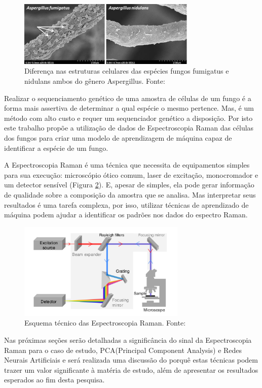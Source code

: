\documentclass[conference,peerreview]{IEEEtran}
\begin{document}
\begin{figure}[ht]
\centering
\includegraphics[width=8.5cm]{fungus_dif}
\caption{Diferença nas estruturas celulares das espécies fungos fumigatus e nidulans ambos do gênero Aspergillus. Fonte: \cite{Lee2015}}
\label{fungus_dif}
\end{figure}

Realizar o sequenciamento genético de uma amostra de células de um fungo é a forma mais assertiva de determinar a qual espécie o mesmo pertence. Mas, é um método com alto custo e requer um sequenciador genético a disposição. Por isto este trabalho propõe a utilização de dados de Espectroscopia Raman das células dos fungos para criar uma modelo de aprendizagem de máquina capaz de identificar a espécie de um fungo.

A Espectroscopia Raman é uma técnica que necessita de equipamentos simples para sua execução: microscópio ótico comum, laser de excitação, monocromador e um detector sensível (Figura \ref{esquema_experimento}). E, apesar de simples, ela pode gerar informação de qualidade sobre a composição da amostra que se analisa. Mas interpretar seus resultados é uma tarefa complexa, por isso, utilizar técnicas de aprendizado de máquina podem ajudar a identificar os padrões nos dados do espectro Raman.

\begin{figure}[ht]
\centering
\includegraphics[width=8cm]{esquema_experimento}
\caption{Esquema técnico das Espectroscopia Raman. Fonte: \cite{Butler2016}}
\label{esquema_experimento}
\end{figure}

Nas próximas seções serão detalhadas a significância do sinal da Espectroscopia Raman para o caso de estudo, PCA(Principal Component Analysis) e Redes Neurais Artificiais e será realizada uma discussão do porquê estas técnicas podem trazer um valor significante à matéria de estudo, além de apresentar os resultados esperados ao fim desta pesquisa.
\end{document}
